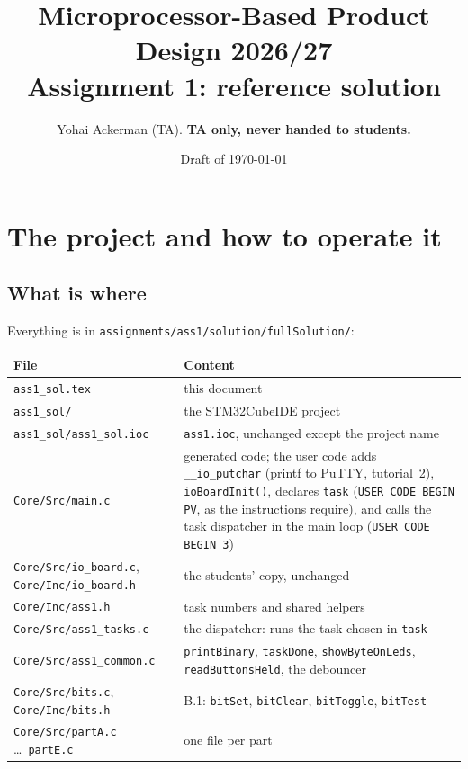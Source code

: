 \documentclass[11pt,a4paper]{article}
\title{Microprocessor-Based Product Design 2026/27\\[2pt]\large Assignment 1: reference solution}
\author{Yohai Ackerman (TA). \textbf{TA only, never handed to students.}}
\date{Draft of \today}
\newcommand{\lv}[1]{\texttt{#1}}                 %
\begin{document}
\maketitle

\section{The project and how to operate it}

\subsection{What is where}
Everything is in \texttt{assignments/ass1/solution/fullSolution/}:

\smallskip\noindent
\begin{tabularx}{\textwidth}{@{}l L@{}}
\toprule
File & Content \\
\midrule
\texttt{ass1\_sol.tex} & this document \\
\texttt{ass1\_sol/} & the STM32CubeIDE project \\
\texttt{ass1\_sol/ass1\_sol.ioc} & \texttt{ass1.ioc}, unchanged except the project name \\
\texttt{Core/Src/main.c} & generated code; the user code adds \texttt{\_\_io\_putchar} (printf to PuTTY, tutorial~2),
  \texttt{ioBoardInit()}, declares \lv{task} (\texttt{USER CODE BEGIN PV}, as the instructions require), and calls
  the task dispatcher in the main loop (\texttt{USER CODE BEGIN 3}) \\
\texttt{Core/Src/io\_board.c}, \texttt{Core/Inc/io\_board.h} & the students' copy, unchanged \\
\texttt{Core/Inc/ass1.h} & task numbers and shared helpers \\
\texttt{Core/Src/ass1\_tasks.c} & the dispatcher: runs the task chosen in \lv{task} \\
\texttt{Core/Src/ass1\_common.c} & \texttt{printBinary}, \texttt{taskDone}, \texttt{showByteOnLeds},
  \texttt{readButtonsHeld}, the debouncer \\
\texttt{Core/Src/bits.c}, \texttt{Core/Inc/bits.h} & B.1: \texttt{bitSet}, \texttt{bitClear}, \texttt{bitToggle},
  \texttt{bitTest} \\
\texttt{Core/Src/partA.c} \ldots\ \texttt{partE.c} & one file per part \\
\bottomrule
\end{tabularx}
\end{document}
